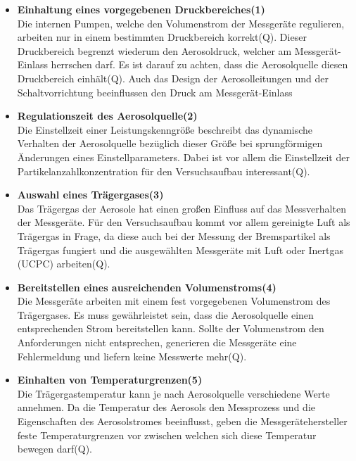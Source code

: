 \begin{itemize}
\item \textbf{Einhaltung eines vorgegebenen Druckbereiches(1)}\\
Die internen Pumpen, welche den Volumenstrom der Messger\"{a}te regulieren, arbeiten nur in einem bestimmten Druckbereich korrekt(Q). Dieser Druckbereich begrenzt wiederum den Aerosoldruck, welcher am Messger\"{a}t-Einlass herrschen darf. Es ist darauf zu achten, dass die Aerosolquelle diesen Druckbereich einh\"{a}lt(Q). 
Auch das Design der Aerosolleitungen und der Schaltvorrichtung beeinflussen den Druck am Messger\"{a}t-Einlass %

\item \textbf{Regulationszeit des Aerosolquelle(2)}\\
Die Einstellzeit einer Leistungskenngr\"{o}{\ss}e beschreibt das dynamische Verhalten der Aerosolquelle bez\"{u}glich dieser Gr\"{o}{\ss}e bei sprungf\"{o}rmigen \"{A}nderungen eines Einstellparameters. Dabei ist vor allem die Einstellzeit der Partikelanzahlkonzentration f\"{u}r den Versuchsaufbau interessant(Q). %

\item \textbf{Auswahl eines Tr\"{a}gergases(3)}\\
Das Tr\"{a}gergas der Aerosole hat einen gro{\ss}en Einfluss auf das Messverhalten der Messger\"{a}te.  F\"{u}r den Versuchsaufbau kommt vor allem gereinigte Luft als Tr\"{a}gergas in Frage, da diese auch bei der Messung der Bremspartikel als Tr\"{a}gergas fungiert und die ausgew\"{a}hlten Messger\"{a}te mit Luft oder Inertgas (UCPC) arbeiten(Q). %

\item \textbf{Bereitstellen eines ausreichenden Volumenstroms(4)}\\
Die Messger\"{a}te arbeiten mit einem fest vorgegebenen Volumenstrom des Tr\"{a}gergases.  Es muss gew\"{a}hrleistet sein, dass die Aerosolquelle einen entsprechenden Strom bereitstellen kann. Sollte der Volumenstrom den Anforderungen nicht entsprechen, generieren die Messger\"{a}te eine Fehlermeldung und liefern keine Messwerte mehr(Q). %

\item \textbf{Einhalten von Temperaturgrenzen(5)}\\ 
Die Tr\"{a}gergastemperatur kann je nach Aerosolquelle verschiedene Werte annehmen. Da die Temperatur des Aerosols den Messprozess und die Eigenschaften des Aerosolstromes beeinflusst, geben die Messger\"{a}tehersteller feste Temperaturgrenzen vor zwischen welchen sich diese Temperatur bewegen darf(Q). 
\end{itemize}

